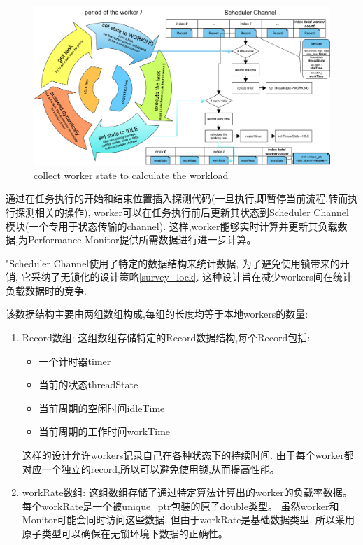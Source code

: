 \documentclass{mproj}
\begin{document}
\begin{figure}[h]
    \centering %
    \includegraphics[width=1.0\textwidth]{images/worker_collect_calculate.pdf} %
    \caption{collect worker state to calculate the workload} %
    \label{fig:worker_collect_calculate} %
\end{figure}
\FloatBarrier

通过在任务执行的开始和结束位置插入探测代码(一旦执行,即暂停当前流程,转而执行探测相关的操作),
worker可以在任务执行前后更新其状态到Scheduler Channel模块(一个专用于状态传输的channel).
这样,worker能够实时计算并更新其负载数据,为Performance Monitor提供所需数据进行进一步计算。

"Scheduler Channel使用了特定的数据结构来统计数据,
为了避免使用锁带来的开销,
它采纳了无锁化的设计策略\cref{survey_lock}.
这种设计旨在减少workers间在统计负载数据时的竞争.

该数据结构主要由两组数组构成,每组的长度均等于本地workers的数量:
\begin{enumerate}
    \item Record数组: 这组数组存储特定的Record数据结构,每个Record包括:
          \begin{itemize}
              \item 一个计时器timer
              \item 当前的状态threadState
              \item 当前周期的空闲时间idleTime
              \item 当前周期的工作时间workTime
          \end{itemize}
          这样的设计允许workers记录自己在各种状态下的持续时间.
          由于每个worker都对应一个独立的record,所以可以避免使用锁,从而提高性能。
    \item workRate数组: 这组数组存储了通过特定算法计算出的worker的负载率数据。
          每个workRate是一个被unique\_ptr包装的原子double类型。
          虽然worker和Monitor可能会同时访问这些数据,
          但由于workRate是基础数据类型,
          所以采用原子类型可以确保在无锁环境下数据的正确性。
\end{enumerate}
\end{document}
